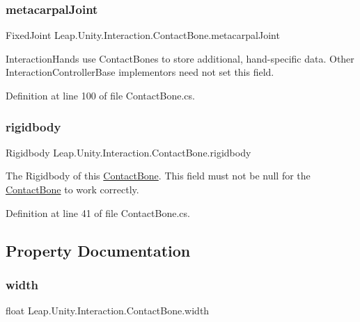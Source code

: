 \subsubsection{\texorpdfstring{metacarpalJoint}{metacarpalJoint}}
{\footnotesize\ttfamily Fixed\+Joint Leap.\+Unity.\+Interaction.\+Contact\+Bone.\+metacarpal\+Joint}



Interaction\+Hands use Contact\+Bones to store additional, hand-\/specific data. Other Interaction\+Controller\+Base implementors need not set this field. 



Definition at line 100 of file Contact\+Bone.\+cs.

\mbox{\label{class_leap_1_1_unity_1_1_interaction_1_1_contact_bone_af615ba6957558427e50254b0d412858d}} 
\subsubsection{\texorpdfstring{rigidbody}{rigidbody}}
{\footnotesize\ttfamily Rigidbody Leap.\+Unity.\+Interaction.\+Contact\+Bone.\+rigidbody}



The Rigidbody of this \mbox{\hyperlink{class_leap_1_1_unity_1_1_interaction_1_1_contact_bone}{Contact\+Bone}}. This field must not be null for the \mbox{\hyperlink{class_leap_1_1_unity_1_1_interaction_1_1_contact_bone}{Contact\+Bone}} to work correctly. 



Definition at line 41 of file Contact\+Bone.\+cs.



\subsection{Property Documentation}
\mbox{\label{class_leap_1_1_unity_1_1_interaction_1_1_contact_bone_a4c9d9346098152d645a62eb3b0bb0b4c}} 
\subsubsection{\texorpdfstring{width}{width}}
{\footnotesize\ttfamily float Leap.\+Unity.\+Interaction.\+Contact\+Bone.\+width\hspace{0.3cm}{\ttfamily [get]}}



